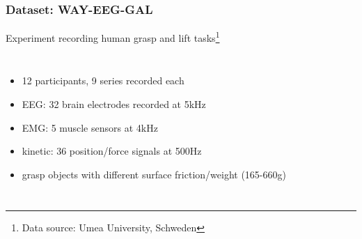 \documentclass{beamer}
\begin{document}
\begin{frame}
\frametitle{Dataset: WAY-EEG-GAL}
Experiment recording human grasp and lift tasks\footnote{Data source: Umea University, Schweden\cite{eeg-emg-dataset}}%



	\begin{columns}
		\begin{itemize}
        	\item 12 participants, 9 series recorded each
        	\item EEG: 32 brain electrodes recorded at 5kHz
        	\item EMG: 5 muscle sensors at 4kHz
        	\item kinetic: 36 position/force signals at 500Hz
        	\item grasp objects with different surface friction/weight (165-660g)
        \end{itemize}
		

\end{columns}
\end{frame}
\end{document}
